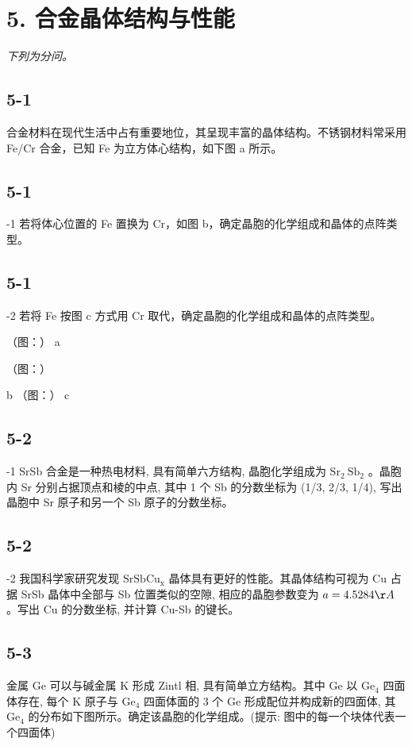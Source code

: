 \section*{5. 合金晶体结构与性能}
\textit{下列为分问。}

\subsection*{5-1}
合金材料在现代生活中占有重要地位，其呈现丰富的晶体结构。不锈钢材料常采用 Fe/Cr 合金，已知 Fe 为立方体心结构，如下图 a 所示。

\subsection*{5-1}
-1 若将体心位置的 Fe 置换为 Cr，如图 b，确定晶胞的化学组成和晶体的点阵类型。

\subsection*{5-1}
-2 若将 Fe 按图 c 方式用 Cr 取代，确定晶胞的化学组成和晶体的点阵类型。

（图：）
a

（图：）

b
（图：）
c

\subsection*{5-2}
-1 SrSb 合金是一种热电材料, 具有简单六方结构, 晶胞化学组成为 $\mathrm{Sr}_{2} \mathrm{~Sb}_{2}$ 。晶胞内 Sr 分别占据顶点和棱的中点, 其中 1 个 Sb 的分数坐标为 (1/3, 2/3, 1/4), 写出晶胞中 Sr 原子和另一个 Sb 原子的分数坐标。

\subsection*{5-2}
-2 我国科学家研究发现 $\mathrm{SrSbCu}_{\mathrm{x}}$ 晶体具有更好的性能。其晶体结构可视为 Cu 占据 SrSb 晶体中全部与 Sb 位置类似的空隙, 相应的晶胞参数变为 $a = 4.5284 \AA$ 。写出 Cu 的分数坐标, 并计算 Cu-Sb 的键长。

\subsection*{5-3}
金属 Ge 可以与碱金属 K 形成 Zintl 相, 具有简单立方结构。其中 Ge 以 $\mathrm{Ge}_{4}$ 四面体存在, 每个 K 原子与 $\mathrm{Ge}_{4}$ 四面体面的 3 个 Ge 形成配位并构成新的四面体, 其 $\mathrm{Ge}_{4}$ 的分布如下图所示。确定该晶胞的化学组成。(提示: 图中的每一个块体代表一个四面体)

